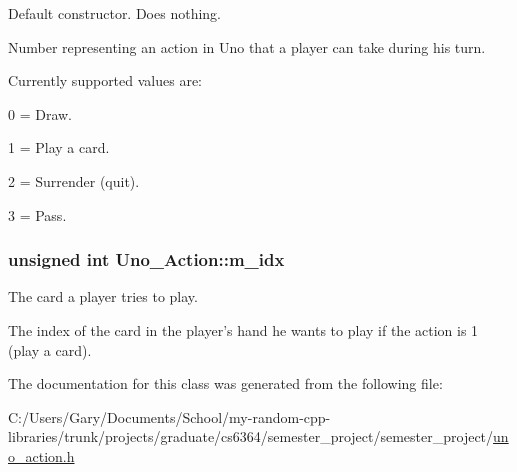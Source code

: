 \-Default constructor. \-Does nothing. 

\-Number representing an action in \-Uno that a player can take during his turn.

\-Currently supported values are\-: \begin{DoxyItemize}
\item 0 = \-Draw. \item 1 = \-Play a card. \item 2 = \-Surrender (quit). \item 3 = \-Pass. \end{DoxyItemize}
\hypertarget{class_uno___action_a228de2b5b030253562cadd34f21568c4}{
\subsubsection[{m\-\_\-idx}]{\setlength{\rightskip}{0pt plus 5cm}unsigned int {\bf \-Uno\-\_\-\-Action\-::m\-\_\-idx}}}
\label{class_uno___action_a228de2b5b030253562cadd34f21568c4}


\-The card a player tries to play. 

\-The index of the card in the player's hand he wants to play if the action is 1 (play a card). 

\-The documentation for this class was generated from the following file\-:\begin{DoxyCompactItemize}
\item 
\-C\-:/\-Users/\-Gary/\-Documents/\-School/my-\/random-\/cpp-\/libraries/trunk/projects/graduate/cs6364/semester\-\_\-project/semester\-\_\-project/\hyperlink{uno__action_8h}{uno\-\_\-action.\-h}\end{DoxyCompactItemize}
